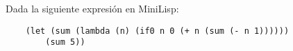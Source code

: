 Dada la siguiente expresión en MiniLisp: 
\begin{verbatim}
    (let (sum (lambda (n) (if0 n 0 (+ n (sum (- n 1))))))
        (sum 5))
\end{verbatim}

